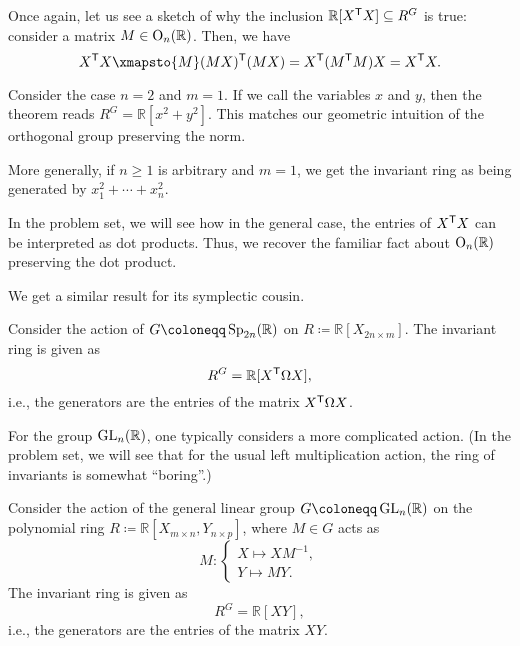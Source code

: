 \documentclass[12pt]{article}
\begin{document}
	Once again, let us see a sketch of why the inclusion 
	$\mathbb{R}[X^{\mathsf{T}} X] \subseteq R^{G}$ is true: 
	consider a matrix $M \in \operatorname{O}_{n}(\mathbb{R})$. 
	Then, we have
	\begin{equation*} 
		X^{\trans} X \xmapsto{M} (M X)^{\trans} (M X) 
		= X^{\trans} (M^{\trans} M) X
		= X^{\trans} X.
	\end{equation*}

	\begin{ex}
		Consider the case $n = 2$ and $m = 1$. 
		If we call the variables $x$ and $y$, then the theorem reads $R^{G} = \mathbb{R}[x^{2} + y^{2}]$. 
		This matches our geometric intuition of the orthogonal group preserving the norm. 

		More generally, if $n \ge 1$ is arbitrary and $m = 1$, we get the invariant ring as being generated by $x_{1}^{2} + \cdots + x_{n}^{2}$. 

		In the problem set, we will see how in the general case, the entries of $X^{\mathsf{T}} X$ can be interpreted as dot products. 
		Thus, we recover the familiar fact about $\operatorname{O}_{n}(\mathbb{R})$ preserving the dot product.
	\end{ex}

	We get a similar result for its symplectic cousin.

	\begin{thm}
		Consider the action of $G \coloneqq \Sp_{2n}(\mathbb{R})$ on $R \coloneqq \mathbb{R}[X_{2n \times m}]$. 
		The invariant ring is given as
		\begin{equation*} 
			R^{G} = \mathbb{R}[X^{\mathsf{T}} \Omega X],
		\end{equation*}
		i.e., the generators are the entries of the matrix $X^{\mathsf{T}} \Omega X$.
	\end{thm}

	For the group $\operatorname{GL}_{n}(\mathbb{R})$, one typically considers a more complicated action. 
	(In the problem set, we will see that for the usual left multiplication action, the ring of invariants is somewhat ``boring''.)

	\begin{thm}
		Consider the action of the general linear group $G \coloneqq \GL_{n}(\mathbb{R})$ on the polynomial ring 
		$R \coloneqq \mathbb{R}[X_{m \times n}, Y_{n \times p}]$, 
		where $M \in G$ acts as
		\begin{equation*} 
			M \colon 
			\begin{cases}
				X \mapsto X M^{-1}, \\
				Y \mapsto M Y.
			\end{cases}
		\end{equation*}
		The invariant ring is given as
		\begin{equation*} 
			R^{G} = \mathbb{R}[X Y],
		\end{equation*}
		i.e., the generators are the entries of the matrix $X Y$.
	\end{thm}
\end{document}
